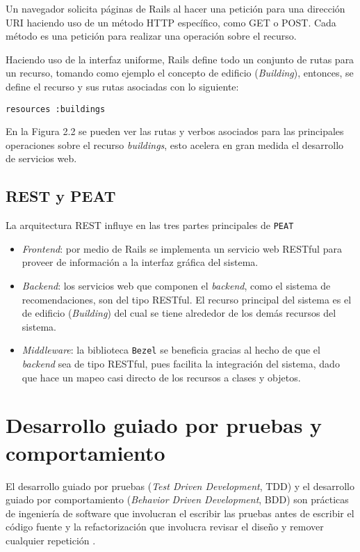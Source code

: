 Un navegador solicita páginas de Rails al hacer una petición para una dirección URI
haciendo uso de un método HTTP específico, como GET o POST. Cada método es una
petición para realizar una operación sobre el recurso.

Haciendo uso de la interfaz uniforme, Rails define todo un conjunto de rutas
para un recurso, tomando como ejemplo el concepto de edificio (\textit{Building}),
entonces, se define el recurso y sus rutas asociadas con lo siguiente:

\begin{verbatim}
resources :buildings
\end{verbatim}

En la Figura 2.2 se pueden ver las rutas y verbos asociados para las principales
operaciones sobre el recurso \textit{buildings}, esto acelera en gran medida
el desarrollo de servicios web.


\subsection{REST y PEAT}
La arquitectura REST influye en las tres partes principales de \texttt{PEAT}

\begin{itemize}
\item \textit{Frontend}: por medio de Rails se implementa un servicio web RESTful
  para proveer de información a la interfaz gráfica del sistema.
\item \textit{Backend}: los servicios web que componen el \textit{backend}, como el
  sistema de recomendaciones, son del tipo RESTful. El recurso principal del sistema
  es el de edificio (\textit{Building}) del cual se tiene alrededor de los demás
  recursos del sistema.
\item \textit{Middleware}: la biblioteca \texttt{Bezel} se beneficia gracias al hecho
  de que el \textit{backend} sea de tipo RESTful, pues facilita la integración del
  sistema, dado que hace un mapeo casi directo de los recursos a clases y objetos.

\end{itemize}


\section{Desarrollo guiado por pruebas y comportamiento}
El desarrollo guiado por pruebas (\textit{Test Driven Development}, TDD) y el
desarrollo guiado por comportamiento (\textit{Behavior Driven Development}, BDD)
son prácticas de ingeniería de software que involucran el escribir las pruebas
antes de escribir el código fuente y la refactorización que involucra revisar el
diseño y remover cualquier repetición \cite{4_beck_2003}\cite{23_chelimsky_2010}.

